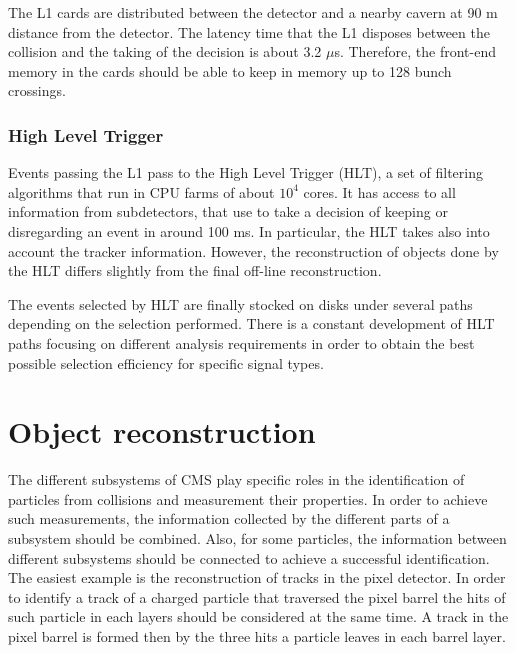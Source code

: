 The L1 cards are distributed between the detector and a nearby cavern at 90 m distance from the detector. The latency time that the L1 disposes between the collision and the taking of the decision is about 3.2 $\mu$s. Therefore, the front-end memory in the cards should be able to keep in memory up to 128 bunch crossings. 

\subsubsection{High Level Trigger}
\label{sec:HLT}


Events passing the L1 pass to the High Level Trigger (HLT), a set of filtering algorithms that run in CPU farms of about $10^{4}$ cores. It has access to all information from subdetectors, that use to take a decision of keeping or disregarding an event in around 100 ms. In particular, the HLT takes also into account the tracker information. However, the reconstruction of objects done by the HLT differs slightly from the final off-line reconstruction.

The events selected by HLT are finally stocked on disks under several paths depending on the selection performed. There is a constant development of HLT paths focusing on different analysis requirements in order to obtain the best possible selection efficiency for specific signal types. 

\section{Object reconstruction}

The different subsystems of CMS play specific roles in the identification of particles from collisions and measurement their properties. In order to achieve such measurements, the information collected by the different parts of a subsystem should be combined. Also, for some particles, the information between different subsystems should be connected to achieve a successful identification. The easiest example is the reconstruction of tracks in the pixel detector. In order to identify a track of a charged particle that traversed the pixel barrel the hits of such particle in each layers should be considered at the same time. A track in the pixel barrel is formed then by the three hits a particle leaves in each barrel layer.

